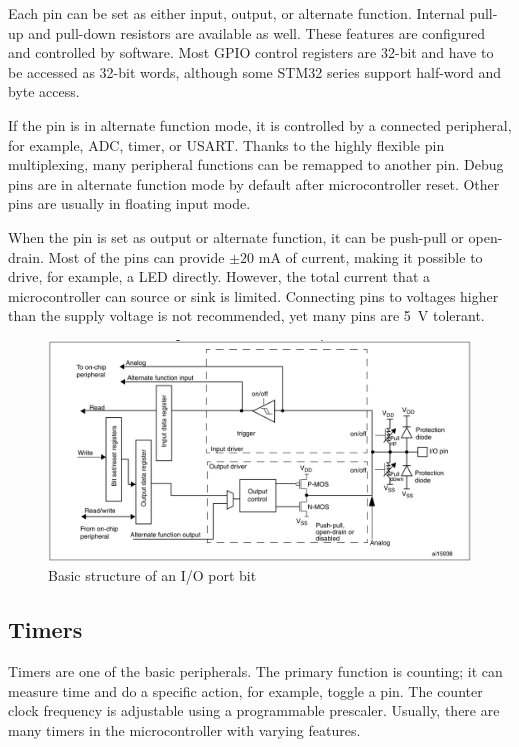 Each pin can be set as either input, output, or alternate function. Internal pull-up and pull-down resistors are available as well. These features are configured and controlled by software. Most GPIO control registers are 32-bit and have to be accessed as 32-bit words, although some STM32 series support half-word and byte access.

If the pin is in alternate function mode, it is controlled by a connected peripheral, for example, ADC, timer, or USART. Thanks to the highly flexible pin multiplexing, many peripheral functions can be remapped to another pin. Debug pins are in alternate function mode by default after microcontroller reset. Other pins are usually in floating input mode.

When the pin is set as output or alternate function, it can be push-pull or open-drain. Most of the pins can provide $\pm20 \text{ mA}$ of current, making it possible to drive, for example, a LED directly. However, the total current that a microcontroller can source or sink is limited. Connecting pins to voltages higher than the supply voltage is not recommended, yet many pins are \SI{5}{\V} tolerant.
\begin{figure}
\centering
\includegraphics[width=0.9\linewidth]{support/pic/io_port.png}
\caption{Basic structure of an I/O port bit \cite{f303_ref}}
\label{fig:gpio}
\end{figure}

	\subsection{Timers}
	\label{sub:timers}
Timers are one of the basic peripherals. The primary function is counting; it can measure time and do a specific action, for example, toggle a pin. The counter clock frequency is adjustable using a programmable prescaler. Usually, there are many timers in the microcontroller with varying features.

